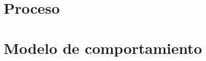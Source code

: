 \documentclass[10pt]{book}
\begin{document}
	\chapter{Proceso}\label{chp:proceso}

	\chapter{Modelo de comportamiento}\label{chp:modeloComportamiento}
	
	
\end{document}

